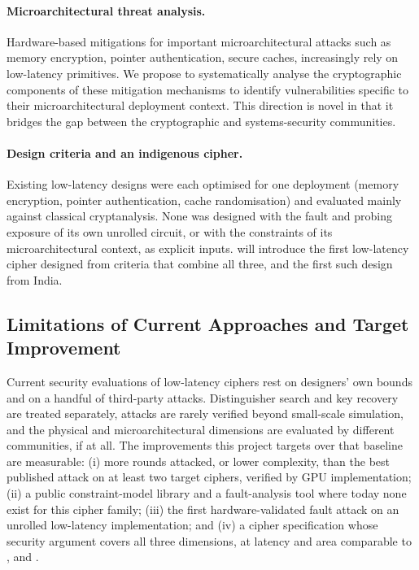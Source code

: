 \paragraph{Microarchitectural threat analysis.}
Hardware-based mitigations for important microarchitectural attacks such as memory encryption, pointer authentication, secure caches, increasingly rely on low-latency primitives.
We propose to systematically analyse the cryptographic components of these mitigation mechanisms to identify vulnerabilities specific to their microarchitectural deployment context.
This direction is novel in that it bridges the gap between the cryptographic and systems-security communities.


\paragraph{Design criteria and an indigenous cipher.}
Existing low-latency designs were each optimised for one deployment (memory encryption, pointer authentication, cache randomisation) and evaluated mainly against classical cryptanalysis.
None was designed with the fault and probing exposure of its own unrolled circuit, or with the constraints of its microarchitectural context, as explicit inputs.
 will introduce the first low-latency cipher designed from criteria that combine all three, and the first such design from India.

\subsection{Limitations of Current Approaches and Target Improvement}

Current security evaluations of low-latency ciphers rest on designers' own bounds and on a handful of third-party attacks.
Distinguisher search and key recovery are treated separately, attacks are rarely verified beyond small-scale simulation, and the physical and microarchitectural dimensions are evaluated by different communities, if at all.
The improvements this project targets over that baseline are measurable:
(i) more rounds attacked, or lower complexity, than the best published attack on at least two target ciphers, verified by GPU implementation;
(ii) a public constraint-model library and a fault-analysis tool where today none exist for this cipher family;
(iii) the first hardware-validated fault attack on an unrolled low-latency implementation; and
(iv) a cipher specification whose security argument covers all three dimensions, at latency and area comparable to ,  and .

